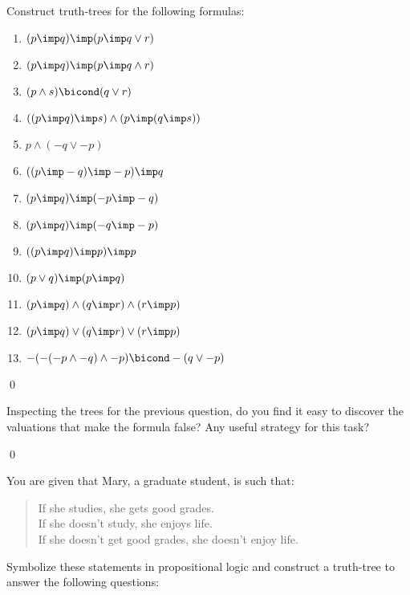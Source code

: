 \documentclass[11pt]{article}
\begin{document}
\begin{itemize}
\hrulefill
\begin{uexercise}\label{treecons}

Construct truth-trees for the following formulas:

\begin{enumerate}
\item $(p\imp q) \imp (p\imp q\lor r)$
\item $(p\imp q) \imp (p\imp q\land r)$
\item $(p\land s) \bicond (q \lor r)$
\item $((p\imp q) \imp s)\land (p\imp (q\imp s))$
\item $p\land (-q\lor -p)$
\item $((p\imp -q) \imp -p) \imp q$
\item $(p\imp q) \imp (-p \imp -q)$
\item $(p\imp q) \imp (-q \imp -p)$
\item $((p\imp q)\imp p) \imp p$
\item $(p\lor q) \imp (p\imp q)$
\item $(p\imp q) \land (q\imp r) \land (r\imp p)$
\item $(p\imp q) \lor (q\imp r) \lor (r\imp p)$
\item $-(-(-p\land -q)\land -p)\bicond -(q\lor -p)$

\end{enumerate}
\qed
\end{uexercise}
\hrulefill

\hrulefill
\begin{uexercise}\label{treeconsfol}
Inspecting the trees for the previous question, do you find it easy to discover
the valuations that make the formula false? Any useful strategy for this task?

\qed
\end{uexercise}
\hrulefill


\hrulefill
\begin{uexercise}\label{treeconsfol}
You are given that Mary, a graduate student, is such that:

\begin{quote}\small
If she studies, she  gets good grades.\\
If she doesn't study, she enjoys life.\\
If she doesn't get good grades, she doesn't enjoy life.
\end{quote}

Symbolize these statements in propositional logic and construct a truth-tree to
answer the following questions:


\end{uexercise}
\end{itemize}
\end{document}
